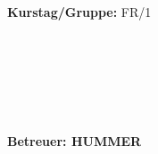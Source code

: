 \documentclass{article}
\begin{document}
\begin{verbatim}


\end{verbatim}
			\begin{flushleft}
			\textbf{\Large{Kurstag/Gruppe:}} \Large{FR/1}
			\end{flushleft}

\begin{verbatim}






\end{verbatim}
			\begin{flushleft}
			\LARGE{\textbf{Betreuer: \Large{HUMMER}}}		
			\end{flushleft}
			
\end{document}
